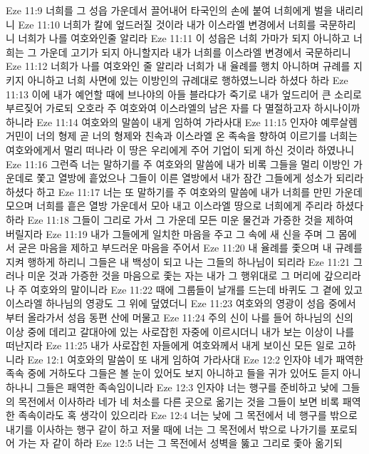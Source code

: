 Eze 11:9  너희를 그 성읍 가운데서 끌어내어 타국인의 손에 붙여 너희에게 벌을 내리리니
Eze 11:10  너희가 칼에 엎드러질 것이라 내가 이스라엘 변경에서 너희를 국문하리니 너희가 나를 여호와인줄 알리라
Eze 11:11  이 성읍은 너희 가마가 되지 아니하고 너희는 그 가운데 고기가 되지 아니할지라 내가 너희를 이스라엘 변경에서 국문하리니
Eze 11:12  너희가 나를 여호와인 줄 알리라 너희가 내 율례를 행치 아니하며 규례를 지키지 아니하고 너희 사면에 있는 이방인의 규례대로 행하였느니라 하셨다 하라
Eze 11:13  이에 내가 예언할 때에 브나야의 아들 블라댜가 죽기로 내가 엎드리어 큰 소리로 부르짖어 가로되 오호라 주 여호와여 이스라엘의 남은 자를 다 멸절하고자 하시나이까 하니라
Eze 11:14  여호와의 말씀이 내게 임하여 가라사대
Eze 11:15  인자야 예루살렘 거민이 너의 형제 곧 너의 형제와 친속과 이스라엘 온 족속을 향하여 이르기를 너희는 여호와에게서 멀리 떠나라 이 땅은 우리에게 주어 기업이 되게 하신 것이라 하였나니
Eze 11:16  그런즉 너는 말하기를 주 여호와의 말씀에 내가 비록 그들을 멀리 이방인 가운데로 쫓고 열방에 흩었으나 그들이 이른 열방에서 내가 잠간 그들에게 성소가 되리라 하셨다 하고
Eze 11:17  너는 또 말하기를 주 여호와의 말씀에 내가 너희를 만민 가운데 모으며 너희를 흩은 열방 가운데서 모아 내고 이스라엘 땅으로 너희에게 주리라 하셨다 하라
Eze 11:18  그들이 그리로 가서 그 가운데 모든 미운 물건과 가증한 것을 제하여 버릴지라
Eze 11:19  내가 그들에게 일치한 마음을 주고 그 속에 새 신을 주며 그 몸에서 굳은 마음을 제하고 부드러운 마음을 주어서
Eze 11:20  내 율례를 좇으며 내 규례를 지켜 행하게 하리니 그들은 내 백성이 되고 나는 그들의 하나님이 되리라
Eze 11:21  그러나 미운 것과 가증한 것을 마음으로 좇는 자는 내가 그 행위대로 그 머리에 갚으리라 나 주 여호와의 말이니라
Eze 11:22  때에 그룹들이 날개를 드는데 바퀴도 그 곁에 있고 이스라엘 하나님의 영광도 그 위에 덮였더니
Eze 11:23  여호와의 영광이 성읍 중에서부터 올라가서 성읍 동편 산에 머물고
Eze 11:24  주의 신이 나를 들어 하나님의 신의 이상 중에 데리고 갈대아에 있는 사로잡힌 자중에 이르시더니 내가 보는 이상이 나를 떠난지라
Eze 11:25  내가 사로잡힌 자들에게 여호와께서 내게 보이신 모든 일로 고하니라
Eze 12:1  여호와의 말씀이 또 내게 임하여 가라사대
Eze 12:2  인자야 네가 패역한 족속 중에 거하도다 그들은 볼 눈이 있어도 보지 아니하고 들을 귀가 있어도 듣지 아니하나니 그들은 패역한 족속임이니라
Eze 12:3  인자야 너는 행구를 준비하고 낮에 그들의 목전에서 이사하라 네가 네 처소를 다른 곳으로 옮기는 것을 그들이 보면 비록 패역한 족속이라도 혹 생각이 있으리라
Eze 12:4  너는 낮에 그 목전에서 네 행구를 밖으로 내기를 이사하는 행구 같이 하고 저물 때에 너는 그 목전에서 밖으로 나가기를 포로되어 가는 자 같이 하라
Eze 12:5  너는 그 목전에서 성벽을 뚫고 그리로 좇아 옮기되

